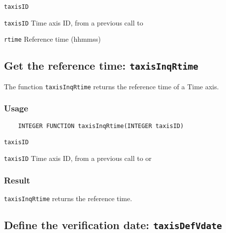 \hspace*{4mm}\begin{minipage}[]{15cm}
\begin{deflist}{\texttt{taxisID}\ }
\item[\texttt{taxisID}]
Time axis ID, from a previous call to {}
\item[\texttt{rtime}]
Reference time (hhmmss)

\end{deflist}
\end{minipage}


\subsection{Get the reference time: \texttt{taxisInqRtime}}
\label{taxisInqRtime}

The function {\texttt{taxisInqRtime}} returns the reference time of a Time axis.

\subsubsection*{Usage}

\begin{verbatim}
    INTEGER FUNCTION taxisInqRtime(INTEGER taxisID)
\end{verbatim}

\hspace*{4mm}\begin{minipage}[]{15cm}
\begin{deflist}{\texttt{taxisID}\ }
\item[\texttt{taxisID}]
Time axis ID, from a previous call to {} or {}

\end{deflist}
\end{minipage}

\subsubsection*{Result}

{\texttt{taxisInqRtime}} returns the reference time.



\subsection{Define the verification date: \texttt{taxisDefVdate}}
\label{taxisDefVdate}

